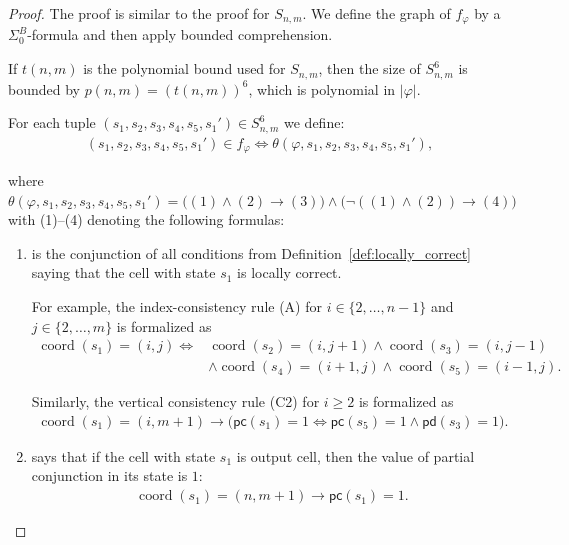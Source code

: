 \documentclass{article}
\theoremstyle{plain}
\theoremstyle{definition}
\DeclareMathOperator{\coord}{coord}
\newcommand{\pc}{\mathsf{pc}}
\newcommand{\pd}{\mathsf{pd}}
\begin{document}
\begin{proof}
The proof is similar to the proof for $S_{n,m}$.
We define the graph of $f_\varphi$ by a $\Sigma^B_0$-formula
and then apply bounded comprehension.

If $t(n,m)$ is the polynomial bound used for $S_{n,m}$,
then the size of $S_{n,m}^6$ is bounded by $p(n,m) = (t(n,m))^6$, which is polynomial in $|\varphi|$.

For each tuple $(s_1,s_2,s_3,s_4,s_5,s_1') \in S_{n,m}^6$
we define:
\begin{align*}
(s_1, s_2, s_3, s_4, s_5, s_1') \in f_\varphi \iff \theta(\varphi, s_1, s_2, s_3, s_4, s_5, s_1'),
\end{align*}

where $\theta(\varphi, s_1, s_2, s_3, s_4, s_5, s_1') = \bigl((1) \wedge (2) \rightarrow (3)\bigr) \wedge \bigl(\neg((1) \wedge (2)) \rightarrow (4)\bigr)$ with (1)--(4) denoting the following formulas:

\begin{enumerate}[label={(\arabic*)}]
    \item is the conjunction of all conditions from  Definition~\ref{def:locally_correct} saying that the cell with state $s_1$ is locally correct.

For example, the index-consistency
rule (A) for $i\in\{2,\dots,n-1\}$ and $j\in\{2,\dots,m\}$ is formalized as
\begin{align*}
    \coord(s_1)=(i,j) \iff &\coord(s_2) = (i, j+1) \wedge \coord(s_3) = (i, j-1) \\& \wedge \coord(s_4) = (i+1, j) \wedge \coord(s_5) = (i-1, j).
\end{align*}


Similarly, the vertical consistency rule (C2) for $i\ge2$ is formalized as
\begin{align*}
    \coord(s_1) = (i,m+1) \rightarrow \bigl( \pc(s_1) =1 \iff \pc(s_5) = 1 \wedge \pd(s_3) = 1 \bigr).
\end{align*}

\item says that if the cell with state $s_1$ is output cell, then the value of partial conjunction in its state is $1$:
\begin{align*}
    \coord(s_1) = (n, m+1) \rightarrow \pc(s_1) = 1.
\end{align*}


\end{enumerate}
\end{proof}
\end{document}
